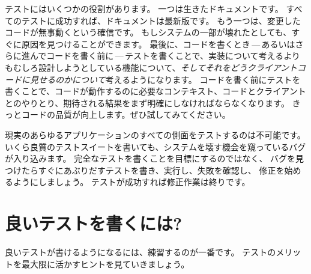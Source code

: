 \documentclass[a4paper,10pt,twoside]{book}
\begin{document}
テストにはいくつかの役割があります。
一つは生きたドキュメントです。
すべてのテストに成功すれば、ドキュメントは最新版です。
もう一つは、変更したコードが無事動くという確信です。
もしシステムの一部が壊れたとしても、すぐに原因を見つけることができます。
最後に、コードを書くとき\,---\,あるいはさらに進んでコードを書く前に\,---\,テストを書くことで、実装について考えるよりもむしろ設計しようとしている機能について、\emph{そしてそれをどうクライアントコードに見せるのかについて}考えるようになります。
コードを書く前にテストを書くことで、コードが動作するのに必要なコンテキスト、コードとクライアントとのやりとり、期待される結果をまず明確にしなければならなくなります。
きっとコードの品質が向上します。ぜひ試してみてください。


現実のあらゆるアプリケーションのすべての側面をテストするのは不可能です。
いくら良質のテストスイートを書いても、システムを壊す機会を窺っているバグが入り込みます。
完全なテストを書くことを目標にするのではなく、
バグを見つけたらすぐにあぶりだすテストを書き、実行し、失敗を確認し、
修正を始めるようにしましょう。
テストが成功すれば修正作業は終りです。
\section{良いテストを書くには?}

良いテストが書けるようになるには、練習するのが一番です。
テストのメリットを最大限に活かすヒントを見ていきましょう。
\end{document}

